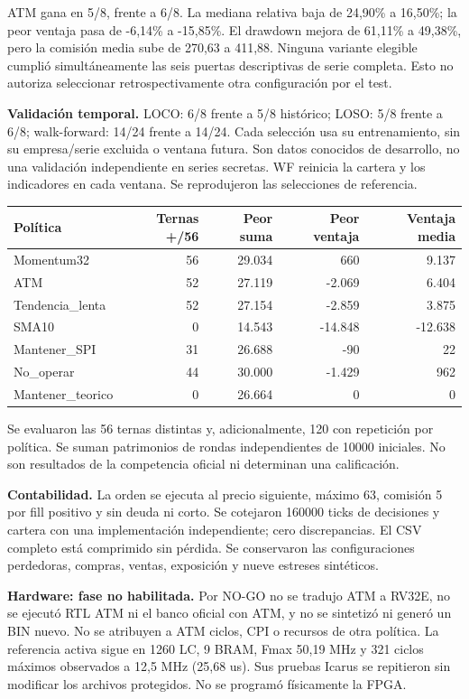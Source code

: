 \documentclass[11pt,a4paper]{article}
\begin{document}
ATM gana en 5/8, frente a 6/8. La mediana relativa baja de 24,90\% a 16,50\%;
la peor ventaja pasa de -6,14\% a -15,85\%. El drawdown mejora de 61,11\% a
49,38\%, pero la comisión media sube de 270,63 a 411,88. Ninguna variante
elegible cumplió simultáneamente las seis puertas descriptivas de serie completa.
Esto no autoriza seleccionar retrospectivamente otra configuración por el test.

\textbf{Validación temporal.} LOCO: 6/8 frente a 5/8 histórico; LOSO: 5/8 frente
a 6/8; walk-forward: 14/24 frente a 14/24. Cada selección usa su entrenamiento,
sin su empresa/serie excluida o ventana futura. Son datos conocidos de desarrollo,
no una validación independiente en series secretas. WF reinicia la cartera y
los indicadores en cada ventana. Se reprodujeron las selecciones de referencia.

\begin{center}\small\begin{tabular}{lrrrr}\toprule
Política & Ternas +/56 & Peor suma & Peor ventaja & Ventaja media\\\midrule
Momentum32 & 56 & 29.034 & 660 & 9.137 \\
ATM & 52 & 27.119 & -2.069 & 6.404 \\
Tendencia\_lenta & 52 & 27.154 & -2.859 & 3.875 \\
SMA10 & 0 & 14.543 & -14.848 & -12.638 \\
Mantener\_SPI & 31 & 26.688 & -90 & 22 \\
No\_operar & 44 & 30.000 & -1.429 & 962 \\
Mantener\_teorico & 0 & 26.664 & 0 & 0 \\
\bottomrule\end{tabular}\end{center}
Se evaluaron las 56 ternas distintas y, adicionalmente, 120 con repetición por
política. Se suman patrimonios de rondas independientes de 10000 iniciales.
No son resultados de la competencia oficial ni determinan una calificación.

\textbf{Contabilidad.} La orden se ejecuta al precio siguiente, máximo 63,
comisión 5 por fill positivo y sin deuda ni corto. Se cotejaron 160000 ticks de
decisiones y cartera con una implementación independiente; cero discrepancias.
El CSV completo está comprimido sin pérdida. Se conservaron las configuraciones
perdedoras, compras, ventas, exposición y nueve estreses sintéticos.

\textbf{Hardware: fase no habilitada.} Por NO-GO no se tradujo ATM a RV32E,
no se ejecutó RTL ATM ni el banco oficial con ATM, y no se sintetizó ni generó
un BIN nuevo. No se atribuyen a ATM ciclos, CPI o recursos de otra política.
La referencia activa sigue en 1260 LC, 9 BRAM, Fmax 50,19 MHz y 321 ciclos
máximos observados a 12,5 MHz (25,68 us). Sus pruebas Icarus se repitieron sin
modificar los archivos protegidos. No se programó físicamente la FPGA.
\end{document}
